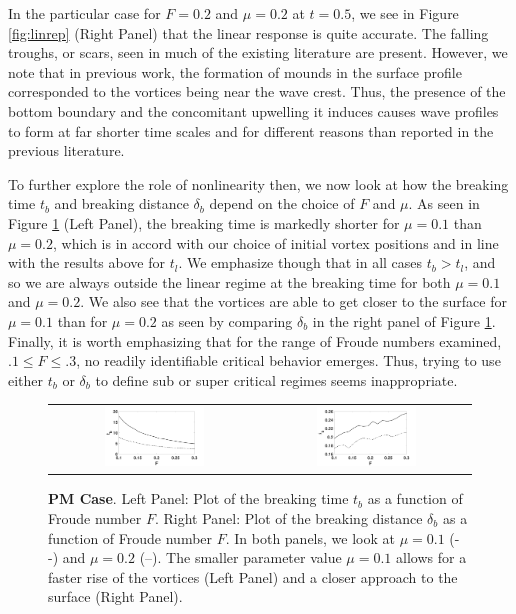 \documentclass[a4paper,11pt]{article}
\begin{document}
In the particular case for $F=0.2$ and $\mu=0.2$ at $t=0.5$, we see in Figure \ref{fig:linrep} (Right Panel) that the linear response is quite accurate.  The falling troughs, or scars, seen in much of the existing literature \cite{marcus,tryggvason} are present.  However, we note that in previous work, the formation of mounds in the surface profile corresponded to the vortices being near the wave crest.  Thus, the presence of the bottom boundary and the concomitant upwelling it induces causes wave profiles to form at far shorter time scales and for different reasons than reported in the previous literature.  

To further explore the role of nonlinearity then, we now look at how the breaking time $t_{b}$ and breaking distance $\delta_{b}$ depend on the choice of $F$ and $\mu$.  As seen in Figure \ref{fig:froudecomp} (Left Panel), the breaking time is markedly shorter for $\mu=0.1$ than $\mu=0.2$, which is in accord with our choice of initial vortex positions and in line with the results above for $t_{l}$.  We emphasize though that in all cases $t_{b}>t_{l}$, and so we are always outside the linear regime at the breaking time for both $\mu=0.1$ and $\mu=0.2$.  We also see that the vortices are able to get closer to the surface for $\mu=0.1$ than for $\mu=0.2$ as seen by comparing $\delta_{b}$ in the right panel of Figure \ref{fig:froudecomp}.  Finally, it is worth emphasizing that for the range of Froude numbers examined, $.1\leq F \leq .3$, no readily identifiable critical behavior emerges.  Thus, trying to use either $t_{b}$ or $\delta_{b}$ to define sub or super critical regimes seems inappropriate.  
%
\begin{figure}[!h]
\centering
\begin{tabular}{cc}
\includegraphics[width=0.5\textwidth]{froude_comp_pm} &
\includegraphics[width=0.5\textwidth]{zmb_pm}
\end{tabular}
\caption{\small {\bf PM Case}. Left Panel: Plot of the breaking time $t_{b}$ as a function of Froude number $F$. Right Panel: Plot of the breaking distance $\delta_{b}$ as a function of Froude number $F$.  In both panels, we look at $\mu=0.1$ (- -) and $\mu=0.2$ (--). The smaller parameter value $\mu=0.1$ allows for a faster rise of the vortices (Left Panel) and a closer approach to the surface (Right Panel).}
\label{fig:froudecomp}
\end{figure}
\end{document}
